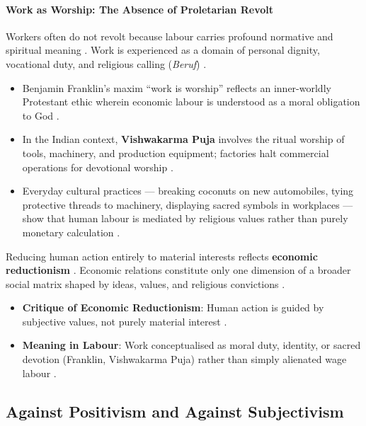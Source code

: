 \paragraph{Work as Worship: The Absence of Proletarian Revolt}
Workers often do not revolt because labour carries profound normative and spiritual meaning . Work is experienced as a domain of personal dignity, vocational duty, and religious calling (\textit{Beruf}) .

\begin{ExampleBox}
\begin{itemize}
    \item Benjamin Franklin's maxim ``work is worship'' reflects an inner-worldly Protestant ethic wherein economic labour is understood as a moral obligation to God .
    \item In the Indian context, \textbf{Vishwakarma Puja} involves the ritual worship of tools, machinery, and production equipment; factories halt commercial operations for devotional worship .
    \item Everyday cultural practices --- breaking coconuts on new automobiles, tying protective threads to machinery, displaying sacred symbols in workplaces --- show that human labour is mediated by religious values rather than purely monetary calculation .
\end{itemize}
\end{ExampleBox}

Reducing human action entirely to material interests reflects \textbf{economic reductionism} . Economic relations constitute only one dimension of a broader social matrix shaped by ideas, values, and religious convictions .

\begin{QuickRevision}
\begin{itemize}
    \item \textbf{Critique of Economic Reductionism}: Human action is guided by subjective values, not purely material interest .
    \item \textbf{Meaning in Labour}: Work conceptualised as moral duty, identity, or sacred devotion (Franklin, Vishwakarma Puja) rather than simply alienated wage labour .
\end{itemize}
\end{QuickRevision}

\subsection{Against Positivism and Against Subjectivism}

